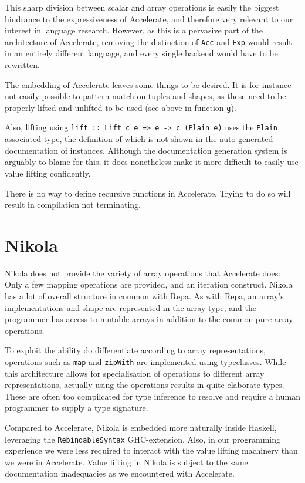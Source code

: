This sharp division between scalar and array operations is easily the biggest
hindrance to the expressiveness of Accelerate, and therefore very relevant to
our interest in language research. However, as this is a pervasive part of the
architecture of Accelerate, removing the distinction of \texttt{Acc} and
\texttt{Exp} would result in an entirely different language, and every single
backend would have to be rewritten.


The embedding of Accelerate leaves some things to be desired. It is for
instance not easily possible to pattern match on tuples and shapes, as these
need to be properly lifted and unlifted to be used (see above in function \texttt{g}).

Also, lifting using \texttt{lift :: Lift c e => e -> c (Plain e)} uses the
\texttt{Plain} associated type, the definition of which is not shown in the
auto-generated documentation of instances. Although the documentation
generation system is arguably to blame for this, it does nonetheless make it
more difficult to easily use value lifting confidently.

There is no way to define recursive functions in Accelerate. Trying to do so
will result in compilation not terminating.

\section{Nikola}

Nikola does not provide the variety of array operations that Accelerate does: Only
a few mapping operations are provided, and an iteration construct.  Nikola has
a lot of overall structure in common with Repa. As with Repa, an array's
implementations and shape are represented in the array type, and the programmer
has access to mutable arrays in addition to the common pure array operations.

To exploit the ability do differentiate according to array representations,
operations such as \texttt{map} and \texttt{zipWith} are implemented using
typeclasses.  While this architecture allows for specialisation of operations
to different array representations, actually using the operations results in quite
elaborate types. These are often too compilcated for type inference to resolve
and require a human programmer to supply a type signature.


Compared to Accelerate, Nikola is embedded more naturally inside Haskell,
leveraging the \texttt{RebindableSyntax} GHC-extension. Also, in our programming
experience we were less required to interact with the value lifting machinery
than we were in Accelerate. Value lifting in Nikola is subject to the same
documentation inadequacies as we encountered with Accelerate.

